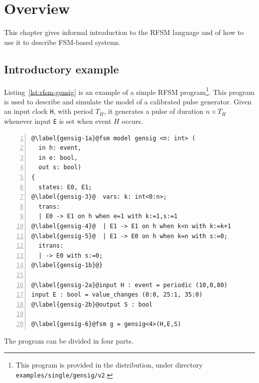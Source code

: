 \chapter{Overview}
\label{cha:overview}

This chapter gives informal introduction to the RFSM language and of how to use it to describe 
FSM-based systems.

\section{Introductory example}
\label{sec:first-example}

Listing~\ref{lst:rfsm-gensig} is an example of a simple RFSM program\footnote{This program is
  provided in the distribution, under directory \texttt{examples/single/gensig/v2}.}. This program is
used to describe and simulate the model of a calibrated pulse generator. Given an input clock
\verb|H|, with period $T_H$, it generates a pulse of duration $n \times T_H$ whenever input
\texttt{E} is set when event $H$ occurs.

\begin{lstlisting}[language=Rfsm,frame=single,numbers=left,caption=A simple RFSM
  program,label={lst:rfsm-gensig},float]
@\label{gensig-1a}@fsm model gensig <n: int> (
  in h: event,
  in e: bool,
  out s: bool)
{
  states: E0, E1;
@\label{gensig-3}@  vars: k: int<0:n>;
  trans:
  | E0 -> E1 on h when e=1 with k:=1,s:=1
@\label{gensig-4}@  | E1 -> E1 on h when k<n with k:=k+1
@\label{gensig-5}@  | E1 -> E0 on h when k=n with s:=0;
  itrans:
  | -> E0 with s:=0;
@\label{gensig-1b}@}

@\label{gensig-2a}@input H : event = periodic (10,0,80)
input E : bool = value_changes (0:0, 25:1, 35:0)
@\label{gensig-2b}@output S : bool 

@\label{gensig-6}@fsm g = gensig<4>(H,E,S)
\end{lstlisting}

The program can be divided in four parts.

